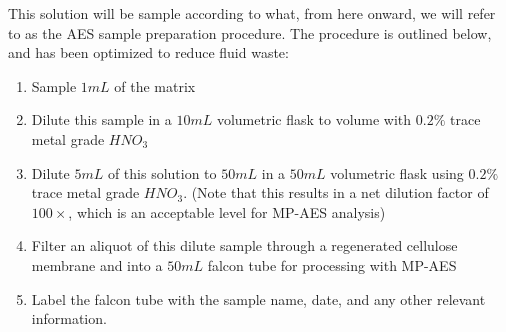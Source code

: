 \documentclass[letterpaper,12pt]{article}
\begin{document}
	\indent
	This solution will be sample according to what, from here onward, we will refer to as the AES sample preparation procedure. The procedure is outlined below, and has been optimized to reduce fluid waste:
	\begin{enumerate}
		\item Sample $1mL$ of the matrix
		\item Dilute this sample in a $10mL$ volumetric flask to volume with $0.2\%$ trace metal grade $HNO_3$
		\item Dilute $5mL$ of this solution to $50mL$ in a $50mL$ volumetric flask using $0.2\%$ trace metal grade $HNO_3$. (Note that this results in a net dilution factor of $100\times$, which is an acceptable level for MP-AES analysis\cite{c2})
		\item Filter an aliquot of this dilute sample through a regenerated cellulose membrane and into a $50mL$ falcon tube for processing with MP-AES
		\item Label the falcon tube with the sample name, date, and any other relevant information.
	\end{enumerate}
	
\end{document}
